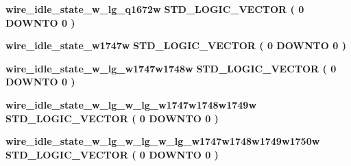 \begin{DoxyCompactItemize}
\item 
{\bf wire\+\_\+idle\+\_\+state\+\_\+w\+\_\+lg\+\_\+q1672w} {\bfseries \textcolor{comment}{S\+T\+D\+\_\+\+L\+O\+G\+I\+C\+\_\+\+V\+E\+C\+T\+OR}\textcolor{vhdlchar}{ }\textcolor{vhdlchar}{(}\textcolor{vhdlchar}{ }\textcolor{vhdlchar}{ } \textcolor{vhdldigit}{0} \textcolor{vhdlchar}{ }\textcolor{keywordflow}{D\+O\+W\+N\+TO}\textcolor{vhdlchar}{ }\textcolor{vhdlchar}{ } \textcolor{vhdldigit}{0} \textcolor{vhdlchar}{ }\textcolor{vhdlchar}{)}\textcolor{vhdlchar}{ }} 
\item 
{\bf wire\+\_\+idle\+\_\+state\+\_\+w1747w} {\bfseries \textcolor{comment}{S\+T\+D\+\_\+\+L\+O\+G\+I\+C\+\_\+\+V\+E\+C\+T\+OR}\textcolor{vhdlchar}{ }\textcolor{vhdlchar}{(}\textcolor{vhdlchar}{ }\textcolor{vhdlchar}{ } \textcolor{vhdldigit}{0} \textcolor{vhdlchar}{ }\textcolor{keywordflow}{D\+O\+W\+N\+TO}\textcolor{vhdlchar}{ }\textcolor{vhdlchar}{ } \textcolor{vhdldigit}{0} \textcolor{vhdlchar}{ }\textcolor{vhdlchar}{)}\textcolor{vhdlchar}{ }} 
\item 
{\bf wire\+\_\+idle\+\_\+state\+\_\+w\+\_\+lg\+\_\+w1747w1748w} {\bfseries \textcolor{comment}{S\+T\+D\+\_\+\+L\+O\+G\+I\+C\+\_\+\+V\+E\+C\+T\+OR}\textcolor{vhdlchar}{ }\textcolor{vhdlchar}{(}\textcolor{vhdlchar}{ }\textcolor{vhdlchar}{ } \textcolor{vhdldigit}{0} \textcolor{vhdlchar}{ }\textcolor{keywordflow}{D\+O\+W\+N\+TO}\textcolor{vhdlchar}{ }\textcolor{vhdlchar}{ } \textcolor{vhdldigit}{0} \textcolor{vhdlchar}{ }\textcolor{vhdlchar}{)}\textcolor{vhdlchar}{ }} 
\item 
{\bf wire\+\_\+idle\+\_\+state\+\_\+w\+\_\+lg\+\_\+w\+\_\+lg\+\_\+w1747w1748w1749w} {\bfseries \textcolor{comment}{S\+T\+D\+\_\+\+L\+O\+G\+I\+C\+\_\+\+V\+E\+C\+T\+OR}\textcolor{vhdlchar}{ }\textcolor{vhdlchar}{(}\textcolor{vhdlchar}{ }\textcolor{vhdlchar}{ } \textcolor{vhdldigit}{0} \textcolor{vhdlchar}{ }\textcolor{keywordflow}{D\+O\+W\+N\+TO}\textcolor{vhdlchar}{ }\textcolor{vhdlchar}{ } \textcolor{vhdldigit}{0} \textcolor{vhdlchar}{ }\textcolor{vhdlchar}{)}\textcolor{vhdlchar}{ }} 
\item 
{\bf wire\+\_\+idle\+\_\+state\+\_\+w\+\_\+lg\+\_\+w\+\_\+lg\+\_\+w\+\_\+lg\+\_\+w1747w1748w1749w1750w} {\bfseries \textcolor{comment}{S\+T\+D\+\_\+\+L\+O\+G\+I\+C\+\_\+\+V\+E\+C\+T\+OR}\textcolor{vhdlchar}{ }\textcolor{vhdlchar}{(}\textcolor{vhdlchar}{ }\textcolor{vhdlchar}{ } \textcolor{vhdldigit}{0} \textcolor{vhdlchar}{ }\textcolor{keywordflow}{D\+O\+W\+N\+TO}\textcolor{vhdlchar}{ }\textcolor{vhdlchar}{ } \textcolor{vhdldigit}{0} \textcolor{vhdlchar}{ }\textcolor{vhdlchar}{)}\textcolor{vhdlchar}{ }} 

\end{DoxyCompactItemize}
